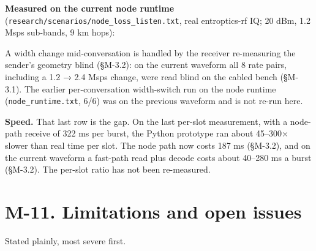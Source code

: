 \documentclass[10pt,letterpaper,twocolumn]{article}
\begin{document}
\textbf{Measured on the current node runtime} (\texttt{research/\allowbreak{}scenarios/\allowbreak{}node\_\allowbreak{}loss\_\allowbreak{}listen.\allowbreak{}txt}, real entroptics-rf IQ; 20 dBm, 1.2 Msps sub-bands, 9 km hops):


A width change mid-conversation is handled by the receiver re-measuring the sender's geometry blind (§M-3.2): on the current waveform all 8 rate pairs, including a 1.2 → 2.4 Msps change, were read blind on the cabled bench (§M-3.1). The earlier per-conversation width-switch run on the node runtime (\texttt{node\_\allowbreak{}runtime.\allowbreak{}txt}, 6/6) was on the previous waveform and is not re-run here.

\textbf{Speed.} That last row is the gap. On the last per-slot measurement, with a node-path receive of 322 ms per burst, the Python prototype ran about 45--300× slower than real time per slot. The node path now costs 187 ms (§M-3.2), and on the current waveform a fast-path read plus decode costs about 40--280 ms a burst (§M-3.2). The per-slot ratio has not been re-measured.

\section{M-11. Limitations and open issues}\label{m-11-limitations-and-open-issues}

Stated plainly, most severe first.
\end{document}
